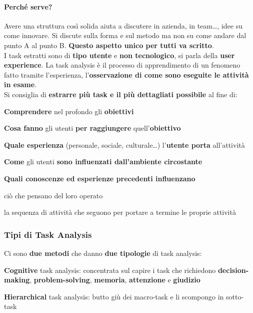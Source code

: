 \documentclass[10pt]{article}
\begin{document}
\paragraph{Perché serve?} Avere una struttura così solida aiuta a discutere in azienda, in team\ldots, idee su come innovare. Si discute sulla forma e sul metodo ma non su come andare dal punto A al punto B. \textbf{Questo aspetto unico per tutti va scritto}.\\
I task estratti sono di \textbf{tipo utente} e \textbf{non tecnologico}, si parla della \textbf{user experience}. La task analysis è il processo di apprendimento di un fenomeno fatto tramite l'esperienza, l'\textbf{osservazione di come sono eseguite le attività in esame}.\\


\pagebreak
Si consiglia di \textbf{estrarre più task e il più dettagliati possibile} al fine di:
\begin{list}{}{}
\item \textbf{Comprendere} nel profondo gli \textbf{obiettivi}
\item \textbf{Cosa fanno} gli utenti \textbf{per raggiungere} quell'\textbf{obiettivo}
\item \textbf{Quale esperienza} (personale, sociale, culturale\ldots) l'\textbf{utente porta} all'attività
\item \textbf{Come} gli utenti \textbf{sono influenzati dall'ambiente circostante}
\item \textbf{Quali conoscenze ed esperienze precedenti influenzano}
\begin{list}{}{}
\item ciò che pensano del loro operato
\item la sequenza di attività che seguono per portare a termine le proprie attività
\end{list} 
\end{list}
\subsubsection{Tipi di Task Analysis}
Ci sono \textbf{due metodi} che danno \textbf{due tipologie} di task analysis:
\begin{list}{}{}
\item \textbf{Cognitive} task analysis: concentrata sul capire i task che richiedono \textbf{decision-making}, \textbf{problem-solving}, \textbf{memoria}, \textbf{attenzione} e \textbf{giudizio}
\item \textbf{Hierarchical} task analysis: butto giù dei macro-task e li scompongo in sotto-task
\end{list}
\end{document}
